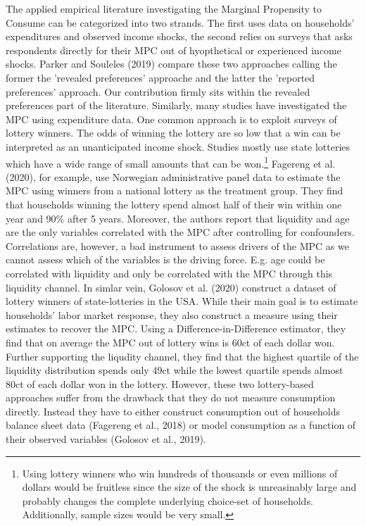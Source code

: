 The applied empirical literature investigating the Marginal Propensity to Consume can be categorized into two strands. The first uses data on households' expenditures and observed income shocks, the second relies on surveys that asks respondents directly for their MPC out of hyopthetical or experienced income shocks. Parker and Souleles (2019) compare these two approaches calling the former the 'revealed preferences' approache and the latter the 'reported preferences' approach. Our contribution firmly sits within the revealed preferences part of the literature. Similarly, many studies have investigated the MPC using expenditure data. One common approach is to exploit surveys of lottery winners. The odds of winning the lottery are so low that a win can be interpreted as an unanticipated income shock. Studies mostly use state lotteries which have a wide range of small amounts that can be won.\footnote{Using lottery winners who win hundreds of thousands or even millions of dollars would be fruitless since the size of the shock is unreasinably large and probably changes the complete underlying choice-set of households. Additionally, sample sizes would be very small.} Fagereng et al. (2020), for example, use Norwegian administrative panel data to estimate the MPC using winners from a national lottery as the treatment group. They find that households winning the lottery spend almost half of their win within one year and 90\% after 5 years. Moreover, the authors report that liquidity and age are the only variables correlated with the MPC after controlling for confounders. Correlations are, however, a bad instrument to assess drivers of the MPC as we cannot assess which of the variables is the driving force. E.g. age could be correlated with liquidity and only be correlated with the MPC through this liquidity channel. In simlar vein, Golosov et al. (2020) construct a dataset of lottery winners of state-lotteries in the USA. While their main goal is to estimate households' labor market response, they also construct a measure using their estimates to recover the MPC. Using a Difference-in-Difference estimator, they find that on average the MPC out of lottery wins is 60ct of each dollar won. Further supporting the liqudity channel, they find that the highest quartile of the liquidity distribution spends only 49ct while the lowest quartile spends almost 80ct of each dollar won in the lottery. However, these two lottery-based approaches suffer from the drawback that they do not measure consumption directly. Instead they have to either construct consumption out of households balance sheet data (Fagereng et al., 2018) or model consumption as a function of their observed variables (Golosov et al., 2019). \\
